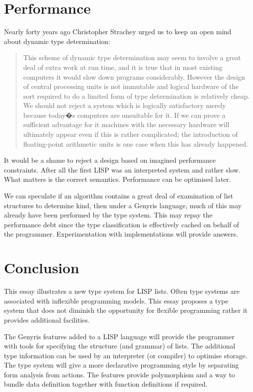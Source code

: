 \documentclass[a4paper,12pt,dvips]{article}
\begin{document}
\section{Performance}
Nearly forty years ago Christopher Strachey urged us to keep an open mind about dynamic type determination\cite{strachey}:
\begin{quote}
This scheme of dynamic type determination may seem to involve a great deal of extra
work at run time, and it is true that in most existing computers it would slow down programs
considerably. However the design of central processing units is not immutable and
logical hardware of the sort required to do a limited form of type determination is relatively cheap. We should not reject a system which is logically satisfactory merely because today�s computers are unsuitable for it. If we can prove a sufficient advantage for it machines with the necessary hardware will ultimately appear even if this is rather complicated; the introduction of floating-point arithmetic units is one case when this has already happened.
\end{quote}
It would be a shame to reject a design based on imagined performance constraints. After all the first LISP was an interpreted system and rather slow. What matters is the correct semantics. Performance can be optimised later.   

We can speculate if an algorithm contains a great deal of examination of list structures to determine kind, then under a Genyris language, much of this may already have been performed by the type system. This may repay the performance debt since the type classification is effectively cached on behalf of the programmer. Experimentation with implementations will provide answers.

\section{Conclusion}
This essay illustrates a new type system for LISP lists. Often type systems are associated with inflexible programming models. This essay proposes a type system that does not diminish the opportunity for flexible programming rather it provides additional facilities.

The Genyris features added to a LISP language will provide the programmer with tools for specifying the structure (and grammar) of lists. The additional type information can be used by an interpreter (or compiler) to optimise storage. The type system will give a more declarative programming style by separating form analysis from actions. The features provide polymorphism and a way to bundle data definition together with function definitions if required. 
\end{document}
